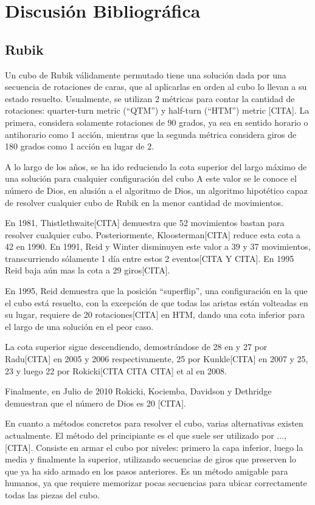 \chapter{Discusión Bibliográfica}

\section*{Rubik}
Un cubo de Rubik válidamente permutado tiene una solución dada por una secuencia de rotaciones de caras, que al aplicarlas en orden al cubo lo llevan a su estado resuelto. Usualmente, se utilizan 2 métricas para contar la cantidad de rotaciones: quarter-turn metric (``QTM'') y half-turn (``HTM'') metric [CITA]. La primera, considera solamente rotaciones de 90 grados, ya sea en sentido horario o antihorario como 1 acción, mientras que la segunda métrica considera giros de 180 grados como 1 acción en lugar de 2.

A lo largo de los años, se ha ido reduciendo la cota superior del largo máximo de una solución para cualquier configuración del cubo A este valor se le conoce el número de Dios, en alusión a el algoritmo de Dios, un algoritmo hipotético capaz de resolver cualquier cubo de Rubik en la menor cantidad de movimientos.

En 1981, Thistlethwaite[CITA] demuestra que 52 movimientos bastan para resolver cualquier cubo. Posteriormente, Kloosterman[CITA] reduce esta cota a 42 en 1990. En 1991, Reid y Winter disminuyen este valor a 39 y 37 movimientos, transcurriendo sólamente 1 día entre estos 2 eventos[CITA Y CITA]. En 1995 Reid baja aún mas la cota a 29 giros[CITA].

En 1995, Reid demuestra que la posición ``superflip'', una configuración en la que el cubo está resuelto, con la excepción de que todas las aristas están volteadas en su lugar, requiere de 20 rotaciones[CITA] en HTM, dando una cota inferior para el largo de una solución en el peor caso.

La cota superior sigue descendiendo, demostrándose de 28 en y 27 por Radu[CITA] en 2005 y 2006 respectivamente, 25 por Kunkle[CITA] en 2007 y 25, 23 y luego 22 por Rokicki[CITA CITA CITA] et al en 2008.

Finalmente, en Julio de 2010 Rokicki, Kociemba, Davidson y Dethridge demuestran que el número de Dios es 20 [CITA].

En cuanto a métodos concretos para resolver el cubo, varias alternativas existen actualmente. El método del principiante es el que suele ser utilizado por ..., [CITA]. Consiste en armar el cubo por niveles: primero la capa inferior, luego la media y finalmente la superior, utilizando secuencias de giros que preserven lo que ya ha sido armado en los pasos anteriores. Es un método amigable para humanos, ya que requiere memorizar pocas secuencias para ubicar correctamente todas las piezas del cubo.

